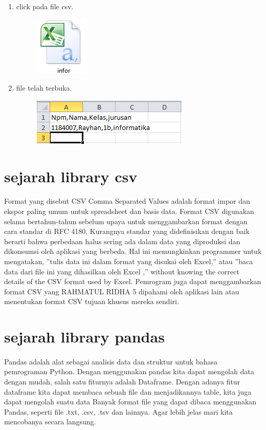 \documentclass[a4paper,12pt]{report}
\begin{document}
\newpage
\begin{enumerate}
\item click pada file csv.
\begin{figure}[h]
\includegraphics[scale=0.8]{gambar/e.png}
\end{figure}
\item file telah terbuka.
\begin{figure}[h]
\includegraphics[scale=0.8]{gambar/r.png}
\end{figure}
\end{enumerate}

\section*{sejarah library csv}
\paragraph{}
Format yang disebut CSV Comma Separated Values
adalah format impor dan ekspor paling umum untuk spreadsheet dan basis
data. Format CSV digunakan selama bertahun-tahun sebelum upaya untuk
menggambarkan format dengan cara standar di RFC 4180. Kurangnya standar
yang didefinisikan dengan baik berarti bahwa perbedaan halus sering ada dalam
data yang diproduksi dan dikonsumsi oleh aplikasi yang berbeda.
Hal ini memungkinkan programmer untuk mengatakan, ”tulis data ini dalam
format yang disukai oleh Excel,” atau ”baca data dari file ini yang dihasilkan
oleh Excel ,” without knowing the correct details of the CSV format used
by Excel. Pemrogram juga dapat menggambarkan format CSV yang
RAHMATUL RIDHA 5
dipahami oleh aplikasi lain atau menentukan format CSV tujuan khusus mereka
sendiri.

\section*{sejarah library pandas}
\paragraph*{}
Pandas adalah alat sebagai analisis data dan struktur untuk bahasa pemrograman Python. Dengan menggunakan pandas kita dapat mengolah data dengan mudah, salah satu fiturnya adalah Dataframe. Dengan adanya fitur dataframe kita dapat membaca sebuah file dan menjadikannya table, kita juga dapat mengolah suatu data Banyak format file yang dapat dibaca menggunakan Pandas, seperti file .txt, .csv, .tsv dan lainnya. Agar lebih jelas mari
kita mencobanya secara langsung.
\end{document}
